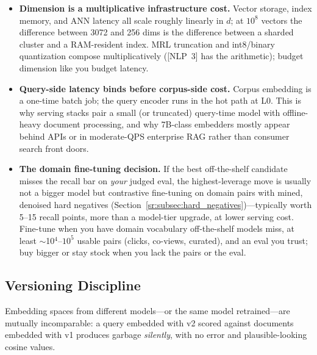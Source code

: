 \begin{itemize}
    \item \textbf{Dimension is a multiplicative infrastructure cost.} Vector storage, index memory, and ANN latency all scale roughly linearly in $d$; at $10^8$ vectors the difference between 3072 and 256 dims is the difference between a sharded cluster and a RAM-resident index. MRL truncation and int8/binary quantization compose multiplicatively ([NLP~3] has the arithmetic); budget dimension like you budget latency.
    \item \textbf{Query-side latency binds before corpus-side cost.} Corpus embedding is a one-time batch job; the query encoder runs in the hot path at L0. This is why serving stacks pair a small (or truncated) query-time model with offline-heavy document processing, and why 7B-class embedders mostly appear behind APIs or in moderate-QPS enterprise RAG rather than consumer search front doors.
    \item \textbf{The domain fine-tuning decision.} If the best off-the-shelf candidate misses the recall bar on \textit{your} judged eval, the highest-leverage move is usually not a bigger model but contrastive fine-tuning on domain pairs with mined, denoised hard negatives (Section~\ref{sr:subsec:hard_negatives})---typically worth 5--15 recall points, more than a model-tier upgrade, at lower serving cost. Fine-tune when you have domain vocabulary off-the-shelf models miss, at least $\sim$10$^4$--$10^5$ usable pairs (clicks, co-views, curated), and an eval you trust; buy bigger or stay stock when you lack the pairs or the eval.
\end{itemize}

\subsection{Versioning Discipline}

Embedding spaces from different models---or the same model retrained---are mutually incomparable: a query embedded with v2 scored against documents embedded with v1 produces garbage \textit{silently}, with no error and plausible-looking cosine values.

